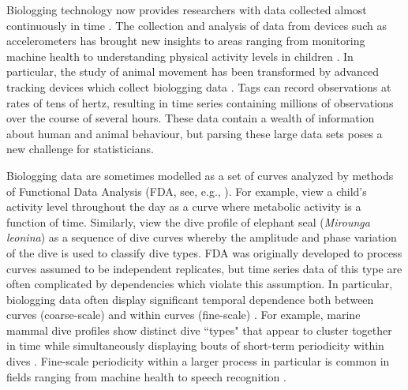 
Biologging technology now provides researchers with data collected almost continuously in time \citep{Hooten:2017}.
The collection and analysis of data from devices such as accelerometers has brought new insights to areas ranging from monitoring machine health \citep{Getman:2009} to understanding physical activity levels in children \citep{Morris:2007}. In particular, the study of animal movement has been transformed by advanced tracking devices which collect biologging data \citep{Borger:2020}. Tags can record observations at rates of tens of hertz, resulting in time series containing millions of observations over the course of several hours. These data contain a wealth of information about human and animal behaviour, but parsing these large data sets poses a new challenge for statisticians.

Biologging data are sometimes modelled as a set of curves analyzed by methods of Functional Data Analysis (FDA, see, e.g., \citet{Ramsay:2005}). For example, \citet{Morris:2007} view a child's activity level throughout the day as a curve where metabolic activity is a function of time. Similarly, \citet{Fu:2017} view the dive profile of elephant seal (\textit{Mirounga leonina}) as a sequence of dive curves whereby the amplitude and phase variation of the dive is used to classify dive types.
%
FDA was originally developed to process curves assumed to be independent replicates, but time series data of this type are often complicated by dependencies which violate this assumption. In particular, biologging data often display significant temporal dependence both between curves (coarse-scale) and within curves (fine-scale) \citep{Barajas:2017}.
For example, marine mammal dive profiles show distinct dive ``types" that appear to cluster together in time  \citep{Tennessen:2019b} while simultaneously displaying bouts of short-term periodicity within dives \citep{Adam:2019}. Fine-scale periodicity within a larger process in particular is common in fields ranging from machine health \citep{Xin:2018,Lucero:2019} to speech recognition \citep{Juang:1991}.

